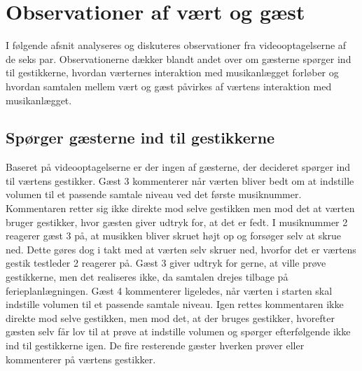 \section{Observationer af vært og gæst}
\label{TestresultaterSocialAcceptGestikkerObservationer}
%
I følgende afsnit analyseres og diskuteres observationer fra videooptagelserne af de seks par. Observationerne dækker blandt andet over om gæsterne spørger ind til gestikkerne, hvordan værternes interaktion med musikanlægget forløber og hvordan samtalen mellem vært og gæst påvirkes af værtens interaktion med musikanlægget.
%
\subsection{Spørger gæsterne ind til gestikkerne}
\label{TestresultaterSocialAcceptGaestSPGGestikker}
%
Baseret på videooptagelserne er der ingen af gæsterne, der decideret spørger ind til værtens gestikker. Gæst 3 kommenterer når værten bliver bedt om at indstille volumen til et passende samtale niveau ved det første musiknummer. Kommentaren retter sig ikke direkte mod selve gestikken men mod det at værten bruger gestikker, hvor gæsten giver udtryk for, at det er fedt. I musiknummer 2 reagerer gæst 3 på, at musikken bliver skruet højt op og forsøger selv at skrue ned. Dette gøres dog i takt med at værten selv skruer ned, hvorfor det er værtens gestik testleder 2 reagerer på. Gæst 3 giver udtryk for gerne, at ville prøve gestikkerne, men det realiseres ikke, da samtalen drejes tilbage på ferieplanlægningen. Gæst 4 kommenterer ligeledes, når værten i starten skal indstille volumen til et passende samtale niveau. Igen rettes kommentaren ikke direkte mod selve gestikken, men mod det, at der bruges gestikker, hvorefter gæsten selv får lov til at prøve at indstille volumen og spørger efterfølgende ikke ind til gestikkerne igen. De fire resterende gæster hverken prøver eller kommenterer på værtens gestikker.  
%
